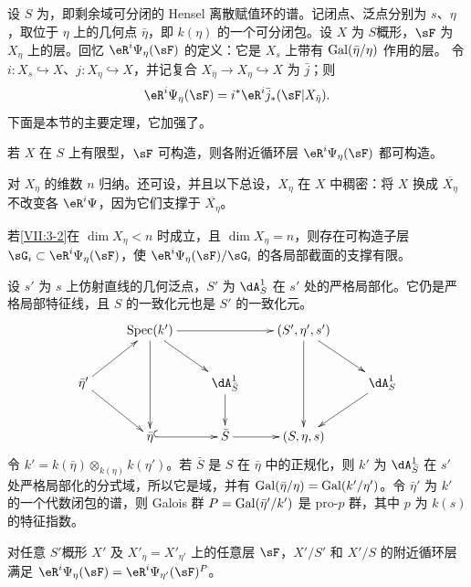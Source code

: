 \subsection{}\label{VII:3-1}
设 $S$ 为，即剩余域可分闭的 Hensel 离散赋值环的谱。记闭点、泛点分别为 $s$、$\eta$，取位于 $\eta$ 上的几何点 $\bar\eta$，即 $k(\eta)$ 的一个可分闭包。设 $X$ 为 $S$概形，$\sF$ 为 $X_\eta$ 上的层。回忆 $\eR^i\Psi_\eta(\sF)$ 的定义：它是 $X_s$ 上带有 $\operatorname{Gal}(\bar\eta/\eta)$ 作用的层。
令 $i:X_s\hookrightarrow X$、$j:X_\eta\hookrightarrow X$，并记复合 $X_{\bar\eta}\to X_\eta\hookrightarrow X$ 为 $\bar j$；则
\[
 \eR^i\Psi_\eta(\sF)=i^\ast\eR^i\bar j_\ast(\sF|X_{\bar\eta}).
\]
下面是本节的主要定理，它加强了\cite[XIII 2.3.1、2.4.2]{sga7}。
\begin{theorem_}\label{VII:3-2}
若 $X$ 在 $S$ 上有限型，$\sF$ 可构造，则各附近循环层 $\eR^i\Psi_\eta(\sF)$ 都可构造。
\end{theorem_}
对 $X_\eta$ 的维数 $n$ 归纳。还可设，并且以下总设，$X_\eta$ 在 $X$ 中稠密：将 $X$ 换成 $\overline{X_\eta}$ 不改变各 $\eR^i\Psi$，因为它们支撑于 $\overline{X_\eta}$。
\begin{lemma_}\label{VII:3-3}
若\ref{VII:3-2}在 $\dim X_\eta<n$ 时成立，且 $\dim X_\eta=n$，则存在可构造子层 $\sG_i\subset\eR^i\Psi_\eta(\sF)$，使 $\eR^i\Psi_\eta(\sF)/\sG_i$ 的各局部截面的支撑有限。
\end{lemma_}
设 $s'$ 为 $s$ 上仿射直线的几何泛点，$S'$ 为 $\dA_S^1$ 在 $s'$ 处的严格局部化。它仍是严格局部特征线，且 $S$ 的一致化元也是 $S'$ 的一致化元。
\[\xymatrix{
 &\spec(k')\ar[rr]\ar[dd]\ar[dr]&&(S',\eta',s')\ar[dr]\ar[dd]\\
 \bar\eta'\ar[ur]\ar[dr]&&\dA_{\bar S}^1\ar[d]&&\dA_S^1\ar[dl]\\
 &\bar\eta\ar@{^{(}->}[r]&\bar S\ar[r]&(S,\eta,s)
}\]
令 $k'=k(\bar\eta)\otimes_{k(\eta)}k(\eta')$。若 $\bar S$ 是 $S$ 在 $\bar\eta$ 中的正规化，则 $k'$ 为 $\dA_{\bar S}^1$ 在 $s'$ 处严格局部化的分式域，所以它是域，并有 $\operatorname{Gal}(\bar\eta/\eta)=\operatorname{Gal}(k'/\eta')$。令 $\bar\eta'$ 为 $k'$ 的一个代数闭包的谱，则 Galois 群 $P=\operatorname{Gal}(\bar\eta'/k')$ 是 pro-$p$ 群，其中 $p$ 为 $k(s)$ 的特征指数。
\begin{lemma_}\label{VII:3-4}
对任意 $S'$概形 $X'$ 及 $X'_\eta=X'_{\eta'}$ 上的任意层 $\sF$，$X'/S'$ 和 $X'/S$ 的附近循环层满足
$\eR^i\Psi_\eta(\sF)=\eR^i\Psi_{\eta'}(\sF)^P$。
\end{lemma_}
